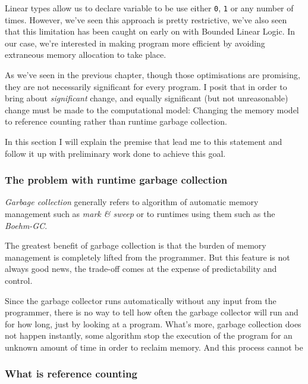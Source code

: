 \documentclass[
]{article}
\begin{document}
Linear types allow us to declare variable to be use either \texttt{0},
\texttt{1} or any number of times. However, we've seen this approach is
pretty restrictive, we've also seen that this limitation has been caught
on early on with Bounded Linear Logic. In our case, we're interested in
making program more efficient by avoiding extraneous memory allocation
to take place.

As we've seen in the previous chapter, though those optimisations are
promising, they are not necessarily significant for every program. I
posit that in order to bring about \emph{significant} change, and
equally significant (but not unreasonable) change must be made to the
computational model: Changing the memory model to reference counting
rather than runtime garbage collection.

In this section I will explain the premise that lead me to this
statement and follow it up with preliminary work done to achieve this
goal.

\hypertarget{the-problem-with-runtime-garbage-collection}{%
\subsubsection{The problem with runtime garbage
collection}\label{the-problem-with-runtime-garbage-collection}}

\emph{Garbage collection} generally refers to algorithm of automatic
memory management such as \emph{mark \& sweep} or to runtimes using them
such as the \emph{Boehm-GC}.

The greatest benefit of garbage collection is that the burden of memory
management is completely lifted from the programmer. But this feature is
not always good news, the trade-off comes at the expense of
predictability and control.

Since the garbage collector runs automatically without any input from
the programmer, there is no way to tell how often the garbage collector
will run and for how long, just by looking at a program. What's more,
garbage collection does not happen instantly, some algorithm stop the
execution of the program for an unknown amount of time in order to
reclaim memory. And this process cannot be

\hypertarget{what-is-reference-counting}{%
\subsubsection{What is reference
counting}\label{what-is-reference-counting}}
\end{document}
